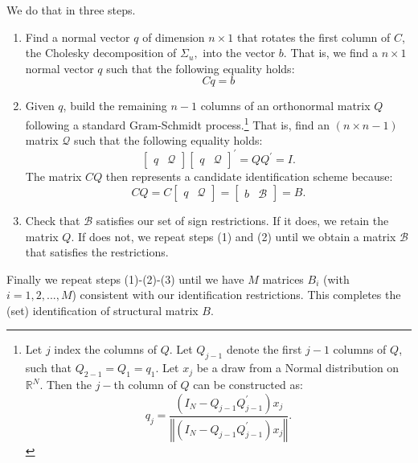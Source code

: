 \documentclass[10pt]{article}
\begin{document}
We do that in three steps.

\begin{enumerate}
\item Find a normal vector $q$ of dimension $n\times 1$ that rotates the
first column of $C$, the Cholesky decomposition of $\Sigma _{u},$ into the
vector $b$. That is, we find a $n\times 1$ normal vector $q$ such that the
following equality holds:%
\begin{equation}
Cq=b
\end{equation}

\item Given $q$, build the remaining $n-1$ columns of an orthonormal matrix $%
Q$ following a standard Gram-Schmidt process.\footnote{%
Let $j$ index the columns of $Q.$ Let $Q_{j-1}$ denote the first $j-1$
columns of $Q$, such that $Q_{2-1}=Q_{1}=q_{1}.$ Let $x_{j}$ be a draw from
a Normal distribution on $\mathbb{R}^{N}.$ Then the $j-$th column of $Q$ can
be constructed as:%
\begin{equation*}
q_{j}=\frac{\left( I_{N}-Q_{j-1}Q_{j-1}^{\prime }\right) x_{j}}{\left\Vert
\left( I_{N}-Q_{j-1}Q_{j-1}^{\prime }\right) x_{j}\right\Vert }.
\end{equation*}%
} That is, find an $(n\times n-1)$ matrix $\mathcal{Q}$ such that the
following equality holds:%
\begin{equation}
\begin{bmatrix}
q & \mathcal{Q}%
\end{bmatrix}%
\begin{bmatrix}
q & \mathcal{Q}%
\end{bmatrix}%
^{\prime }=QQ^{\prime }=I.
\end{equation}%
The matrix $CQ$ then represents a candidate identification scheme because:%
\begin{equation}
CQ=C%
\begin{bmatrix}
q & \mathcal{Q}%
\end{bmatrix}%
=%
\begin{bmatrix}
b & \mathcal{B}%
\end{bmatrix}%
=B.
\end{equation}

\item Check that $\mathcal{B}$ satisfies our set of sign restrictions. If it
does, we retain the matrix $Q$. If does not, we repeat steps (1) and (2)
until we obtain a matrix $\mathcal{B}$ that satisfies the restrictions.
\end{enumerate}

\noindent Finally we repeat steps (1)-(2)-(3) until we have $M$ matrices $%
B_{i}$ (with $i=1,2,...,M$) consistent with our identification restrictions.
This completes the (set) identification of structural matrix $B$.
\end{document}
